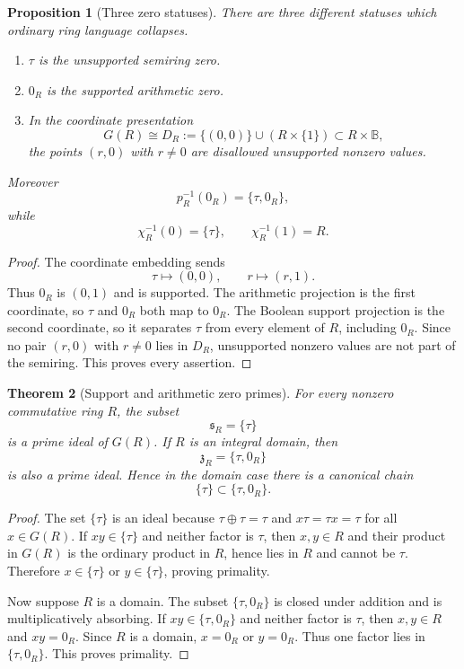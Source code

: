 \documentclass[11pt]{article}
\newtheorem{theorem}{Theorem}[section]
\newtheorem{proposition}[theorem]{Proposition}
\newcommand{\BB}{\mathbb B}
\begin{document}
\begin{proposition}[Three zero statuses]
There are three different statuses which ordinary ring language collapses.
\begin{enumerate}[label=(\roman*)]
\item $\tau$ is the unsupported semiring zero.
\item $0_R$ is the supported arithmetic zero.
\item In the coordinate presentation
\[
        G(R)\cong D_R:=\{(0,0)\}\cup(R\times\{1\})\subset R\times\BB,
\]
the points $(r,0)$ with $r\ne0$ are disallowed unsupported nonzero values.
\end{enumerate}
Moreover
\[
        p_R^{-1}(0_R)=\{\tau,0_R\},
\]
while
\[
        \chi_R^{-1}(0)=\{\tau\},\qquad \chi_R^{-1}(1)=R.
\]
\end{proposition}

\begin{proof}
The coordinate embedding sends
\[
        \tau\mapsto(0,0),\qquad r\mapsto(r,1).
\]
Thus $0_R$ is $(0,1)$ and is supported.  The arithmetic projection is the first coordinate, so $\tau$ and $0_R$ both map to $0_R$.  The Boolean support projection is the second coordinate, so it separates $\tau$ from every element of $R$, including $0_R$.  Since no pair $(r,0)$ with $r\ne0$ lies in $D_R$, unsupported nonzero values are not part of the semiring.  This proves every assertion.
\end{proof}

\begin{theorem}[Support and arithmetic zero primes]
For every nonzero commutative ring $R$, the subset
\[
        \mathfrak s_R=\{\tau\}
\]
is a prime ideal of $G(R)$.  If $R$ is an integral domain, then
\[
        \mathfrak z_R=\{\tau,0_R\}
\]
is also a prime ideal.  Hence in the domain case there is a canonical chain
\[
        \{\tau\}\subset\{\tau,0_R\}.
\]
\end{theorem}

\begin{proof}
The set $\{\tau\}$ is an ideal because $\tau\oplus\tau=\tau$ and $x\tau=\tau x=\tau$ for all $x\in G(R)$.  If $xy\in\{\tau\}$ and neither factor is $\tau$, then $x,y\in R$ and their product in $G(R)$ is the ordinary product in $R$, hence lies in $R$ and cannot be $\tau$.  Therefore $x\in\{\tau\}$ or $y\in\{\tau\}$, proving primality.

Now suppose $R$ is a domain.  The subset $\{\tau,0_R\}$ is closed under addition and is multiplicatively absorbing.  If $xy\in\{\tau,0_R\}$ and neither factor is $\tau$, then $x,y\in R$ and $xy=0_R$.  Since $R$ is a domain, $x=0_R$ or $y=0_R$.  Thus one factor lies in $\{\tau,0_R\}$.  This proves primality.
\end{proof}
\end{document}
